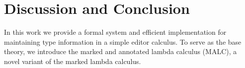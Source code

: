 \documentclass[acmsmall,dvipsnames,10pt,nonacm]{acmart}\settopmatter{printfolios=true} %
\begin{document}
















\section{Discussion and Conclusion}%
\label{sec:Discussion and Conclusion}
In this work we provide a formal system and efficient implementation for maintaining type information in a simple editor calculus. To serve as the base theory, we introduce the marked and annotated lambda calculus (MALC), a novel variant of the marked lambda calculus. 
\end{document}
